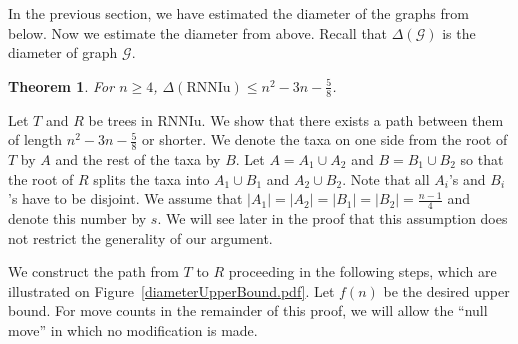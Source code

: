 \documentclass[11pt]{amsart}
\newtheorem{theorem}[lemma]{Theorem}
\theoremstyle{definition}
\newcommand{\rnniu}{\mathrm{RNNIu}}
\newcommand{\G}{\mathcal{G}}
\begin{document}
In the previous section, we have estimated the diameter of the graphs from below.
Now we estimate the diameter from above.
Recall that $\Delta(\G)$ is the diameter of graph $\G$.

\begin{theorem}
\label{diameterUpperBound}
For $n \ge 4$, $\Delta(\rnniu) \le n^2 - 3n - \displaystyle\frac 58$.
\end{theorem}

\proof
Let $T$ and $R$ be trees in $\rnniu$.
We show that there exists a path between them of length $n^2 - 3n - \frac 58$ or shorter.
We denote the taxa on one side from the root of $T$ by $A$ and the rest of the taxa by $B$.
Let $A = A_1 \cup A_2$ and $B = B_1 \cup B_2$ so that the root of $R$ splits the taxa into $A_1 \cup B_1$ and $A_2 \cup B_2$.
Note that all $A_i$'s and $B_i$'s have to be disjoint.
We assume that $|A_1| = |A_2| = |B_1| = |B_2| = \frac{n-1}{4}$ and denote this number by $s$.
We will see later in the proof that this assumption does not restrict the generality of our argument.

We construct the path from $T$ to $R$ proceeding in the following steps, which are illustrated on Figure~\ref{diameterUpperBound.pdf}.
Let $f(n)$ be the desired upper bound.
For move counts in the remainder of this proof, we will allow the ``null move'' in which no modification is made.
\end{document}
